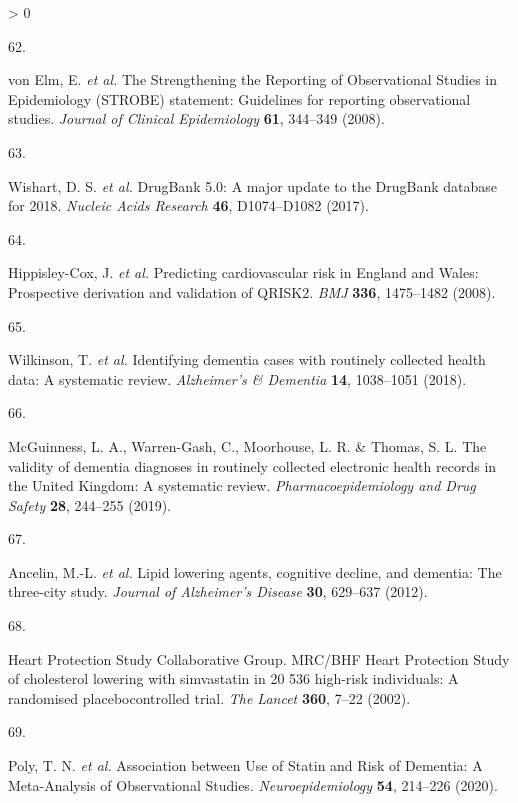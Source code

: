 \documentclass[a4paper, twoside]{templates/ociamthesis}
\newlength{\cslhangindent}
\newlength{\csllabelwidth}
\newenvironment{CSLReferences}[3] %
 {%
  \setlength{\parindent}{0pt}
  \ifodd #1 \everypar{\setlength{\hangindent}{\cslhangindent}}\ignorespaces\fi
  \ifnum #2 > 0
  \setlength{\parskip}{#2\baselineskip}
  \fi
 }%
 {}
\newcommand{\CSLLeftMargin}[1]{\parbox[t]{\maxof{\widthof{#1}}{\csllabelwidth}}{#1}}
\newcommand{\CSLRightInline}[1]{\parbox[t]{\linewidth - \csllabelwidth}{#1}}
\begin{document}
\begin{CSLReferences}{0}{0}
\leavevmode\hypertarget{ref-vonelm2008}{}%
\CSLLeftMargin{62. }
\CSLRightInline{von Elm, E. \emph{et al.} The {Strengthening} the {Reporting} of {Observational Studies} in {Epidemiology} ({STROBE}) statement: Guidelines for reporting observational studies. \emph{Journal of Clinical Epidemiology} \textbf{61}, 344--349 (2008).}

\leavevmode\hypertarget{ref-wishart2017}{}%
\CSLLeftMargin{63. }
\CSLRightInline{Wishart, D. S. \emph{et al.} {DrugBank} 5.0: A major update to the {DrugBank} database for 2018. \emph{Nucleic Acids Research} \textbf{46}, D1074--D1082 (2017).}

\leavevmode\hypertarget{ref-hippisley-cox2008}{}%
\CSLLeftMargin{64. }
\CSLRightInline{Hippisley-Cox, J. \emph{et al.} Predicting cardiovascular risk in {England} and {Wales}: Prospective derivation and validation of {QRISK2}. \emph{BMJ} \textbf{336}, 1475--1482 (2008).}

\leavevmode\hypertarget{ref-wilkinson2018a}{}%
\CSLLeftMargin{65. }
\CSLRightInline{Wilkinson, T. \emph{et al.} Identifying dementia cases with routinely collected health data: {A} systematic review. \emph{Alzheimer's \& Dementia} \textbf{14}, 1038--1051 (2018).}

\leavevmode\hypertarget{ref-mcguinness2019c}{}%
\CSLLeftMargin{66. }
\CSLRightInline{McGuinness, L. A., Warren-Gash, C., Moorhouse, L. R. \& Thomas, S. L. The validity of dementia diagnoses in routinely collected electronic health records in the {United Kingdom}: {A} systematic review. \emph{Pharmacoepidemiology and Drug Safety} \textbf{28}, 244--255 (2019).}

\leavevmode\hypertarget{ref-ancelin2012}{}%
\CSLLeftMargin{67. }
\CSLRightInline{Ancelin, M.-L. \emph{et al.} Lipid lowering agents, cognitive decline, and dementia: The three-city study. \emph{Journal of Alzheimer's Disease} \textbf{30}, 629--637 (2012).}

\leavevmode\hypertarget{ref-heartprotectionstudycollaborativegroup2002}{}%
\CSLLeftMargin{68. }
\CSLRightInline{Heart Protection Study Collaborative Group. {MRC}/{BHF Heart Protection Study} of cholesterol lowering with simvastatin in 20 536 high-risk individuals: A randomised placebocontrolled trial. \emph{The Lancet} \textbf{360}, 7--22 (2002).}

\leavevmode\hypertarget{ref-poly2020}{}%
\CSLLeftMargin{69. }
\CSLRightInline{Poly, T. N. \emph{et al.} Association between {Use} of {Statin} and {Risk} of {Dementia}: {A Meta}-{Analysis} of {Observational Studies}. \emph{Neuroepidemiology} \textbf{54}, 214--226 (2020).}


\end{CSLReferences}
\end{document}
